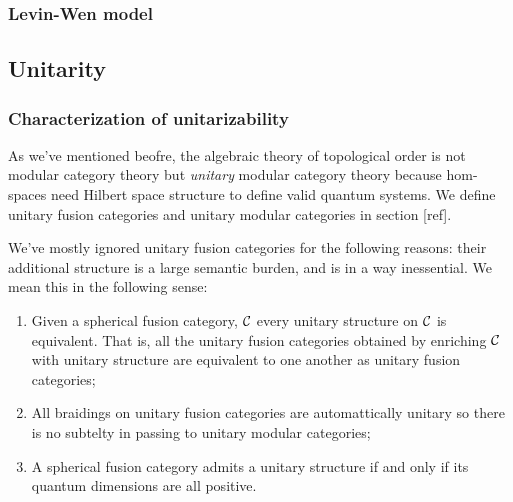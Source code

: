 \subsubsection{Levin-Wen model}





\subsection{Unitarity}

\subsubsection{Characterization of unitarizability}



As we've mentioned beofre, the algebraic theory of topological order is not modular category theory but {\em unitary} modular category theory because hom-spaces need Hilbert space structure to define valid quantum systems. We define unitary fusion categories and unitary modular categories in section [ref].

We've mostly ignored unitary fusion categories for the following reasons: their additional structure is a large semantic burden, and is in a way inessential. We mean this in the following sense:

\begin{enumerate}
\item Given a spherical fusion category, ${\mathcal C}$ every unitary structure on ${\mathcal C}$ is equivalent. That is, all the unitary fusion categories obtained by enriching ${\mathcal C}$ with unitary structure are equivalent to one another as unitary fusion categories;

\item All braidings on unitary fusion categories are automattically unitary so there is no subtelty in passing to unitary modular categories;

\item A spherical fusion category admits a unitary structure if and only if its quantum dimensions are all positive.
\end{enumerate}

